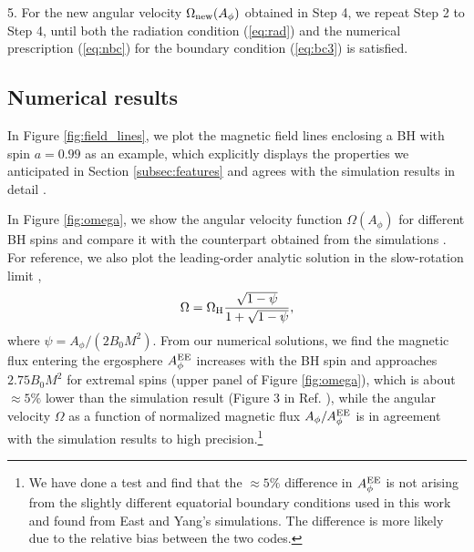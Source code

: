 \documentclass[aps,prd,reprint,nofootinbib, superscriptaddress]{revtex4-1}
\def\Ap{A_\phi}
\def\be{\begin{equation}}
\def\ee{\end{equation}}
\def\WH{\Omega_{\rm H}}
\def\AEE{A_\phi^{\rm EE}}
\begin{document}
 5. For the new angular velocity $\Omega_{\rm new}(\Ap)$ obtained in Step 4, we repeat Step 2 to Step 4,
 until both the radiation condition (\ref{eq:rad}) and the numerical prescription (\ref{eq:nbc}) for the boundary condition (\ref{eq:bc3}) is satisfied.

\subsection{Numerical results}

In Figure \ref{fig:field_lines}, we plot the magnetic field lines enclosing a BH with spin $a =0.99$ as an example,
which explicitly displays the properties we anticipated in Section \ref{subsec:features} and agrees with
the simulation results in detail \cite{East2018}.

In Figure \ref{fig:omega}, we show the angular velocity function $\Omega(A_\phi)$ for different BH spins and
compare it with the counterpart obtained from the simulations \cite{East2018}.
For reference, we also plot the leading-order analytic solution in the slow-rotation
limit \cite{Beskin2013, Pan2014, Gralla2015, East2018},
\be
    \Omega = \WH\frac{\sqrt{1-\psi}} {1+\sqrt{1-\psi}},
\ee
where $\psi = \Ap/(2B_0M^2)$.
From our numerical solutions, we find the magnetic flux entering the ergosphere $\AEE$ increases with
the BH spin and approaches $2.75 B_0 M^2$ for extremal spins (upper panel of Figure \ref{fig:omega}),
which is about $\approx 5\%$ lower than the simulation result (Figure 3 in Ref. \cite{East2018}),
while the angular velocity $\Omega$ as a function
of normalized magnetic flux $\Ap/\AEE$ is in agreement with the
simulation results to high precision.\footnote{We have done a test and
find that the $\approx 5\%$ difference in $\AEE$ is not arising from the slightly
different equatorial boundary conditions used in this work and found from East and Yang's simulations.
The difference is more likely due to the relative bias between the two codes. }
\end{document}
